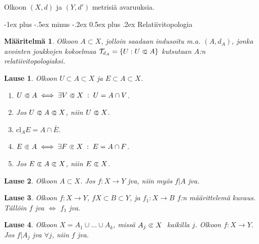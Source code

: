 \documentclass[landscape,a4paper,9pt]{extarticle}
\makeatletter
\renewcommand{\section}{\@startsection{section}{1}{0mm}%
                                {-1ex plus -.5ex minus -.2ex}%
                                {0.5ex plus .2ex}%
                                {\color{blue}\normalfont\large\bfseries}}
\newcommand\opn{\mathrel{\ooalign{$\subset$\cr
  \hidewidth\hbox{$\circ\mkern.5mu$}\cr}}}
\newcommand\cls{\mathrel{\ooalign{$\subset$\cr
\hidewidth\raise.225ex\hbox{$\text{{\scriptsize c}}\mkern2mu$}\cr}}}
\theoremstyle{customtheoremstyle}
\newtheorem*{theorem}{Lause}
\newtheorem*{definition}{Määritelmä}
\makeatother
\begin{document}
\begin{multicols*}{3}

Olkoon $(X,d)$ ja $(Y,d')$ metrisiä avaruuksia.

\section{Relatiivitopologia}

\begin{definition}
  Olkoon $A \subset X$, jolloin saadaan indusoitu m.a. $(A,d_A)$, jonka
  avointen joukkojen kokoelmaa $\mathcal{T}_{d_A} = \{ U : U \opn A \}$
  kutsutaan $A$:n relatiivitopologiaksi.
\end{definition}


\begin{theorem}
  Olkoon $U \subset A \subset X$ ja $E \subset A \subset X$.
  \begin{enumerate}
    \item{$U \opn A \iff \exists V \opn X \;:\; U = A \cap V$.}
    \item{Jos $U \opn A \opn X$, niin $U \opn X$.}
    \item{$\text{cl}_A E = A \cap \bar{E}$.}
    \item{$E \cls A \iff \exists F \cls X \;:\; E = A \cap F$.}
    \item{Jos $E \cls A \cls X$, niin $E \cls X$.}
  \end{enumerate}
\end{theorem}

\begin{theorem}
  Olkoon $A \subset X$. Jos $f: X \rightarrow Y$ jva, niin myös $f|A$ jva.
\end{theorem}

\begin{theorem}
  Olkoon $f: X \rightarrow Y$, $f X \subset B \subset Y$, ja $f_1 : X
  \rightarrow B$ $f$:n määrittelemä kuvaus. Tällöin $f$ jva $\iff$ $f_1$ jva.
\end{theorem}

\begin{theorem}
  Olkoon $X = A_1 \cup ... \cup A_k$, missä $A_j \cls X \;$ kaikilla $j$.
  Olkoon $f: X \rightarrow Y$. Jos $f|A_j$ jva $\forall j$, niin
  $f$ jva.
\end{theorem}



\end{multicols*}
\end{document}
